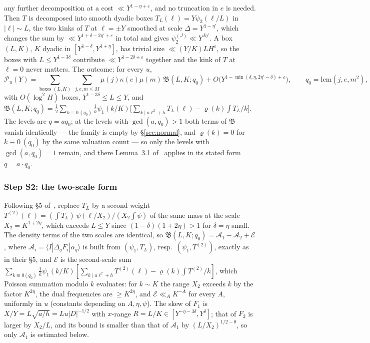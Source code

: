 \documentclass[11pt,a4paper]{article}
\begin{document}
any further decomposition at a cost $\ll Y^{1-\eta+\varepsilon}$, and no truncation in $e$ is needed. Then $T$ is decomposed into smooth dyadic boxes $T_L(\ell)=Y\psi_2(\ell/L)$ in
$|\ell|\sim L$, the two kinks of $T$ at $\ell=\pm Y$ smoothed at scale $\Delta=Y^{1-\eta'}$, which changes the sum by $\ll Y^{1+\delta-2\eta'+\varepsilon}$ in total and gives
$\psi_2^{(J)}\ll Y^{J\eta'}$. A box $(L,K)$, $K$ dyadic in $[Y^{1-\delta},Y^{1+\eta}]$, has trivial size $\ll(Y/K)LH^{\varepsilon}$, so the boxes with $L\le Y^{1-3\delta}$ contribute
$\ll Y^{1-2\delta+\varepsilon}$ together and the kink of $T$ at $\ell=0$ never matters. The outcome: for every $u$,
\begin{equation}\label{eq:S1out}
\mathcal P_u(Y)=\sum_{\text{boxes }(L,K)}\ \sum_{j,e,m\le M}\mu(j)\kappa(e)\mu(m)\,\mathfrak B(L,K;q_0)+O\bigl(Y^{1-\min(\delta,\eta,2\eta'-\delta)+\varepsilon}\bigr),\qquad q_0=\mathrm{lcm}(j,e,m^2),
\end{equation}
with $O(\log^2H)$ boxes, $Y^{1-3\delta}\le L\le Y$, and
$\mathfrak B(L,K;q_0)=\frac12\sum_{k\equiv0\,(q_0)}\frac1k\psi_1(k/K)\bigl[\sum_{k\mid a\ell^2+h}T_L(\ell)-\varrho(k)\int T_L/k\bigr]$. The levels are $q=aq_0$; at the levels with
$\gcd(a,q_0)>1$ both terms of $\mathfrak B$ vanish identically --- the family is empty by \S\ref{sec:normal}, and $\varrho(k)=0$ for $k\equiv0\ (q_0)$ by the same valuation count ---
so only the levels with $\gcd(a,q_0)=1$ remain, and there Lemma~3.1 of~\cite{GrimmeltMerikoski2025quadratic} applies in its stated form $q=a\cdot q_0$.

\subsubsection*{Step S2: the two-scale form}
Following \S5 of~\cite{GrimmeltMerikoski2025quadratic}, replace $T_L$ by a second weight $T^{(2)}(\ell)=(\int T_L)\,\psi(\ell/X_2)/(X_2\int\psi)$ of the same mass at the scale
$X_2=K^{1+2\eta}$, which exceeds $L\le Y$ since $(1-\delta)(1+2\eta)>1$ for $\delta=\eta$ small. The density terms of the two scales are identical, so
$\mathfrak B(L,K;q_0)=\mathcal A_1-\mathcal A_2+\mathcal E$, where $\mathcal A_i=\langle I|\Delta_qF_i|\alpha_q\rangle$ is built from $(\psi_1,T_L)$, resp.\ $(\psi_1,T^{(2)})$, exactly as in
their \S5, and $\mathcal E$ is the second-scale sum $\sum_{k\equiv0(q_0)}\frac1k\psi_1(k/K)[\sum_{k\mid a\ell^2+h}T^{(2)}(\ell)-\varrho(k)\int T^{(2)}/k]$, which Poisson summation modulo $k$
evaluates: for $k\sim K$ the range $X_2$ exceeds $k$ by the factor $K^{2\eta}$, the dual frequencies are $\ge K^{2\eta}$, and $\mathcal E\ll_A K^{-A}$ for every $A$, uniformly in $u$
(constants depending on $A,\eta,\psi$). The skew of $F_1$ is $X/Y=L\sqrt{a/h}=Lu|D|^{-1/2}$ with $x$-range $R=L/K\in[Y^{-\eta-3\delta},Y^{\delta}]$; that of $F_2$ is larger by $X_2/L$,
and its bound is smaller than that of $\mathcal A_1$ by $(L/X_2)^{1/2-\theta}$, so only $\mathcal A_1$ is estimated below.
\end{document}
